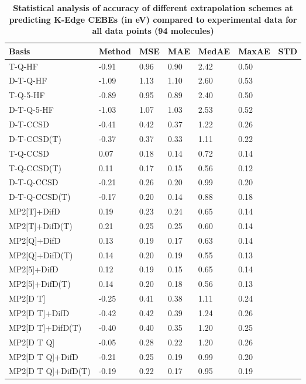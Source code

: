\begin{table}
  \caption{\textbf{Statistical analysis of accuracy of different extrapolation schemes at predicting K-Edge CEBEs (in eV) compared to experimental data for all data points (94 molecules)}}
  \label{tbl:extrap-all-summary}
  \begin{tabular}{l l l l l l l }
    \toprule
    \textbf{Basis} & \textbf{Method} & \textbf{MSE} & \textbf{MAE} & \textbf{MedAE} & \textbf{MaxAE} & \textbf{STD} \\ 
    \midrule
    T-Q-HF & -0.91 & 0.96 & 0.90 & 2.42 & 0.50 \\ 
    D-T-Q-HF & -1.09 & 1.13 & 1.10 & 2.60 & 0.53 \\ 
    T-Q-5-HF & -0.89 & 0.95 & 0.89 & 2.40 & 0.50 \\ 
    D-T-Q-5-HF & -1.03 & 1.07 & 1.03 & 2.53 & 0.52 \\ 
    D-T-CCSD & -0.41 & 0.42 & 0.37 & 1.22 & 0.26 \\ 
    D-T-CCSD(T) & -0.37 & 0.37 & 0.33 & 1.11 & 0.22 \\ 
    T-Q-CCSD & 0.07 & 0.18 & 0.14 & 0.72 & 0.14 \\ 
    T-Q-CCSD(T) & 0.11 & 0.17 & 0.15 & 0.56 & 0.12 \\ 
    D-T-Q-CCSD & -0.21 & 0.26 & 0.20 & 0.99 & 0.20 \\ 
    D-T-Q-CCSD(T) & -0.17 & 0.20 & 0.14 & 0.88 & 0.18 \\ 
    MP2[T]+DifD & 0.19 & 0.23 & 0.24 & 0.65 & 0.14 \\ 
    MP2[T]+DifD(T) & 0.21 & 0.25 & 0.25 & 0.60 & 0.14 \\ 
    MP2[Q]+DifD & 0.13 & 0.19 & 0.17 & 0.63 & 0.14 \\ 
    MP2[Q]+DifD(T) & 0.14 & 0.20 & 0.19 & 0.55 & 0.13 \\ 
    MP2[5]+DifD & 0.12 & 0.19 & 0.15 & 0.65 & 0.14 \\ 
    MP2[5]+DifD(T) & 0.14 & 0.20 & 0.18 & 0.56 & 0.13 \\ 
    MP2[D T] & -0.25 & 0.41 & 0.38 & 1.11 & 0.24 \\ 
    MP2[D T]+DifD & -0.42 & 0.42 & 0.39 & 1.24 & 0.26 \\ 
    MP2[D T]+DifD(T) & -0.40 & 0.40 & 0.35 & 1.20 & 0.25 \\ 
    MP2[D T Q] & -0.05 & 0.28 & 0.22 & 1.20 & 0.26 \\ 
    MP2[D T Q]+DifD & -0.21 & 0.25 & 0.19 & 0.99 & 0.20 \\ 
    MP2[D T Q]+DifD(T) & -0.19 & 0.22 & 0.17 & 0.95 & 0.19 \\ 

\end{tabular}
\end{table}
